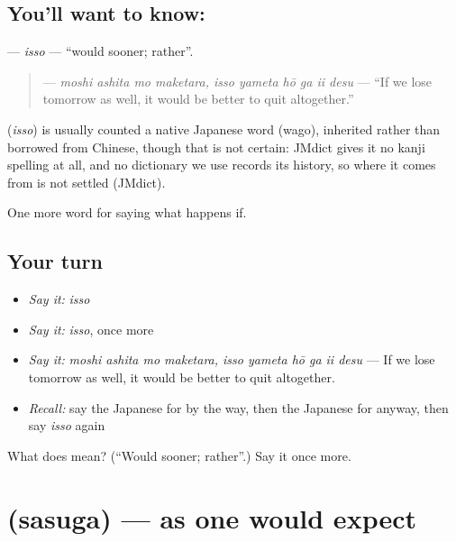 \subsection*{You'll want to know: }
\textbf{} — \emph{isso} — \textquotedblleft{}would sooner; rather\textquotedblright{}.

\begin{quote}
\textbf{     } — \emph{moshi ashita mo maketara, isso yameta hō ga ii desu} — \textquotedblleft{}If we lose tomorrow as well, it would be better to quit altogether.\textquotedblright{}
\end{quote}

\begin{cousinweb}
\textbf{} (\emph{isso}) is usually counted a native Japanese word (wago), inherited rather than borrowed from Chinese, though that is not certain: JMdict gives it no kanji spelling at all, and no dictionary we use records its history, so where it comes from is not settled (JMdict).
\end{cousinweb}

\begin{grammarlens}[title={What you've built}]
One more word for saying what happens if.
\end{grammarlens}

\subsection*{Your turn}
\begin{itemize}
\raggedright
  \item \emph{Say it:} \emph{isso}
  \item \emph{Say it:} \emph{isso}, once more
  \item \emph{Say it:} \emph{moshi ashita mo maketara, isso yameta hō ga ii desu} — If we lose tomorrow as well, it would be better to quit altogether.
  \item \emph{Recall:} say the Japanese for by the way, then the Japanese for anyway, then say \emph{isso} again
\end{itemize}

\begin{tcolorbox}[breakable,colback=teal!4,colframe=teal!35!black,title={Before you move on}]
What does  mean? (\textquotedblleft{}Would sooner; rather\textquotedblright{}.) Say it once more.
\end{tcolorbox}
\section[\texorpdfstring{\ja{さすが} (sasuga)}{さすが (sasuga)}]{ (sasuga) — as one would expect}

